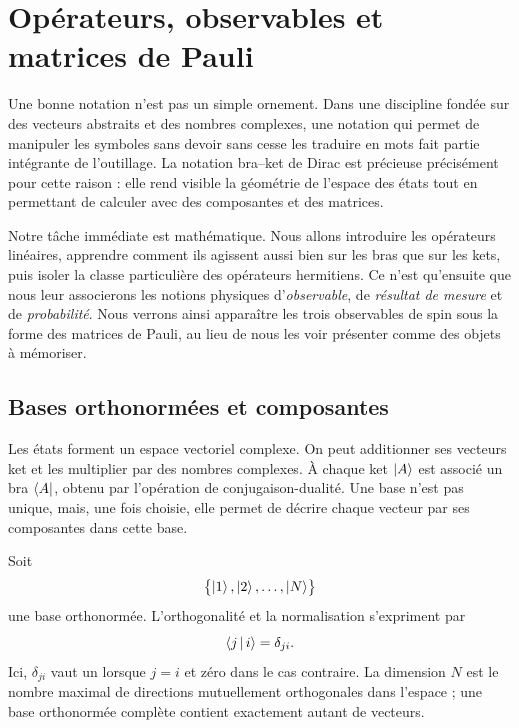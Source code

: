 \chapter{Opérateurs, observables et matrices de Pauli}

Une bonne notation n’est pas un simple ornement. Dans une discipline fondée sur des vecteurs abstraits et des nombres complexes, une notation qui permet de manipuler les symboles sans devoir sans cesse les traduire en mots fait partie intégrante de l’outillage. La notation bra--ket de Dirac est précieuse précisément pour cette raison : elle rend visible la géométrie de l’espace des états tout en permettant de calculer avec des composantes et des matrices.

Notre tâche immédiate est mathématique. Nous allons introduire les opérateurs linéaires, apprendre comment ils agissent aussi bien sur les bras que sur les kets, puis isoler la classe particulière des opérateurs hermitiens. Ce n’est qu’ensuite que nous leur associerons les notions physiques d’\emph{observable}, de \emph{résultat de mesure} et de \emph{probabilité}. Nous verrons ainsi apparaître les trois observables de spin sous la forme des matrices de Pauli, au lieu de nous les voir présenter comme des objets à mémoriser.

\section{Bases orthonormées et composantes}

Les états forment un espace vectoriel complexe. On peut additionner ses vecteurs ket et les multiplier par des nombres complexes. À chaque ket \(\left\lvert A\right\rangle\) est associé un bra \(\left\langle A\right\rvert\), obtenu par l’opération de conjugaison-dualité. Une base n’est pas unique, mais, une fois choisie, elle permet de décrire chaque vecteur par ses composantes dans cette base.

Soit
\[
\bigl\{\left\lvert1\right\rangle,\left\lvert2\right\rangle,\ldots,\left\lvert N\right\rangle\bigr\}
\]
une base orthonormée. L’orthogonalité et la normalisation s’expriment par
\begin{equation}
\left\langle j\,\middle|\,i\right\rangle=\delta_{ji}.
\label{eq:orthonormal-basis}
\end{equation}
Ici, \(\delta_{ji}\) vaut un lorsque \(j=i\) et zéro dans le cas contraire. La dimension \(N\) est le nombre maximal de directions mutuellement orthogonales dans l’espace ; une base orthonormée complète contient exactement autant de vecteurs.

